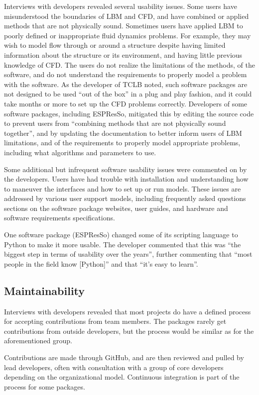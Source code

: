 \documentclass[final, 3p, times, authoryear]{elsarticle}
\begin{document}
Interviews with developers revealed several usability issues. Some users have
misunderstood the boundaries of LBM and CFD, and have combined or applied
methods that are not physically sound. Sometimes users have applied LBM to
poorly defined or inappropriate fluid dynamics problems. For example, they may
wish to model flow through or around a structure despite having limited
information about the structure or its environment, and having little previous
knowledge of CFD. The users do not realize the limitations of the methods, of
the software, and do not understand the requirements to properly model a problem
with the software. As the developer of TCLB noted, such software packages are
not designed to be used ``out of the box'' in a plug and play fashion, and it
could take months or more to set up the CFD problems correctly. Developers of
some software packages, including ESPResSo, mitigated this by editing the source
code to prevent users from ``combining methods that are not physically sound
together'', and by updating the documentation to better inform users of LBM
limitations, and of the requirements to properly model appropriate problems,
including what algorithms and parameters to use. 

Some additional but infrequent software usability issues were commented on by
the developers. Users have had trouble with installation and understanding how
to maneuver the interfaces and how to set up or run models. These issues are
addressed by various user support models, including frequently asked questions
sections on the software package websites, user guides, and hardware and
software requirements specifications.

One software package (ESPResSo) changed some of its scripting language to Python
to make it more usable. The developer commented that this was ``the biggest step
in terms of usability over the years'', further commenting that ``most people in
the field know [Python]'' and that ``it's easy to learn''. 

\subsection{Maintainability}

Interviews with developers revealed that most projects do have a defined process
for accepting contributions from team members. The packages rarely get
contributions from outside developers, but the process would be similar as for
the aforementioned group.

Contributions are made through GitHub, and are then reviewed and pulled by lead
developers, often with consultation with a group of core developers depending on
the organizational model. Continuous integration is part of the process for some
packages. 
\end{document}
